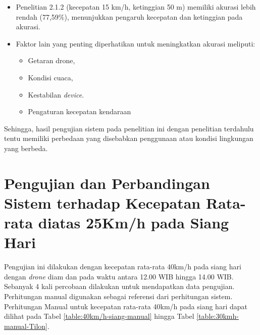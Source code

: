 \begin{itemize}[nolistsep]
    \item Penelitian 2.1.2 (kecepatan 15 km/h, ketinggian 50 m) memiliki akurasi lebih rendah (77,59\%), menunjukkan pengaruh kecepatan dan ketinggian pada akurasi.
    \item Faktor lain yang penting diperhatikan untuk meningkatkan akurasi meliputi:
    \begin{itemize}[nolistsep]
        \item Getaran drone,
        \item Kondisi cuaca,
        \item Kestabilan \emph{device}.
        \item Pengaturan kecepatan kendaraan
    \end{itemize}
\end{itemize}
Sehingga, hasil pengujian sistem pada penelitian ini dengan penelitian terdahulu tentu memiliki perbedaan yang disebabkan penggunaan atau kondisi lingkungan yang berbeda.
\vspace{20pt}
\section{Pengujian dan Perbandingan Sistem terhadap Kecepatan Rata-rata diatas 25Km/h pada Siang Hari}
Pengujian ini dilakukan dengan kecepatan rata-rata 40km/h pada siang hari dengan \emph{drone} diam dan pada waktu antara 12.00 WIB hingga 14.00 WIB. Sebanyak 4 kali percobaan dilakukan untuk mendapatkan data pengujian. Perhitungan manual digunakan sebagai referensi dari perhitungan sistem. Perhitungan Manual untuk kecepatan rata-rata 40km/h pada siang hari dapat dilihat pada Tabel \ref{table:40km/h-siang-manual} hingga Tabel \ref{table:30kmh-manual-Tilon}.


